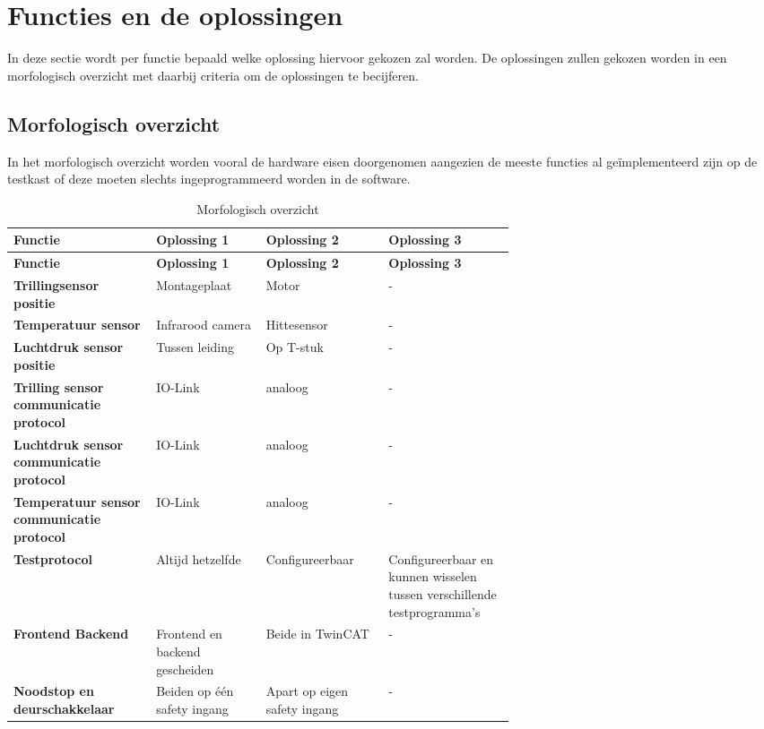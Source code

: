 \section{Functies en de oplossingen}

In deze sectie wordt per functie bepaald welke oplossing hiervoor gekozen zal worden. De oplossingen zullen gekozen worden in een morfologisch overzicht met daarbij criteria om de oplossingen te becijferen.

\subsection{Morfologisch overzicht}

In het morfologisch overzicht worden vooral de hardware eisen doorgenomen aangezien de meeste functies al geïmplementeerd zijn op de testkast of deze moeten slechts ingeprogrammeerd worden in de software.

\begin{xltabular}{\linewidth}{|p{0.2\linewidth}|p{0.15\linewidth}|p{0.15\linewidth}|p{0.15\linewidth}|}
	\caption{Morfologisch overzicht} \\
	\hline
	\textbf{Functie} & \textbf{Oplossing 1} & \textbf{Oplossing 2} & \textbf{Oplossing 3} \\
	\hline
	\endfirsthead
	\hline
	\textbf{Functie} & \textbf{Oplossing 1} & \textbf{Oplossing 2} & \textbf{Oplossing 3} \\
	\hline
	\endhead
	\hline
	\endfoot
	\hline
	\endlastfoot
	\textbf{Trillingsensor positie} &  Montageplaat & Motor & - \\
	\hline
	\textbf{Temperatuur sensor} &  Infrarood camera & Hittesensor & - \\
	\hline
	\textbf{Luchtdruk sensor positie} & Tussen leiding &  Op T-stuk & - \\
	\hline
	\textbf{Trilling sensor communicatie protocol} &  IO-Link & analoog & - \\
	\hline
	\textbf{Luchtdruk sensor communicatie protocol} & IO-Link &  analoog & - \\
	\hline 
	\textbf{Temperatuur sensor communicatie protocol} &  IO-Link & analoog & - \\
	\hline
	\textbf{Testprotocol} & Altijd hetzelfde & Configureerbaar &  Configureerbaar en kunnen wisselen tussen verschillende testprogramma's \\
	\hline
	\textbf{Frontend Backend} &  Frontend en backend gescheiden & Beide in TwinCAT & - \\
	\hline
	\textbf{Noodstop en deurschakkelaar} & Beiden op één safety ingang &  Apart op eigen safety ingang & - \\
	\hline
\end{xltabular}
